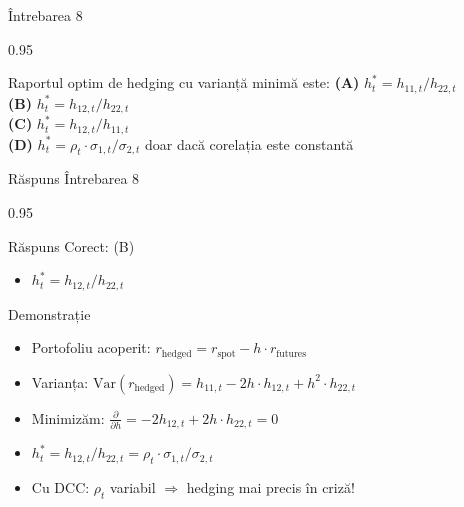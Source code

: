 \documentclass[9pt, aspectratio=169, t]{beamer}
\begin{document}
\begin{frame}{Întrebarea 8}
    \begin{cminipage}{0.95\textwidth}
    \begin{block}{Raportul optim de hedging cu varianță minimă este:}
        \textcolor{MainBlue}{\textbf{(A)}} $h_t^* = h_{11,t} / h_{22,t}$\\[3pt]
        \textcolor{MainBlue}{\textbf{(B)}} $h_t^* = h_{12,t} / h_{22,t}$\\[3pt]
        \textcolor{MainBlue}{\textbf{(C)}} $h_t^* = h_{12,t} / h_{11,t}$\\[3pt]
        \textcolor{MainBlue}{\textbf{(D)}} $h_t^* = \rho_t \cdot \sigma_{1,t} / \sigma_{2,t}$ doar dacă corelația este constantă
    \end{block}
    \end{cminipage}
\end{frame}

\begin{frame}{Răspuns Întrebarea 8}
    \begin{cminipage}{0.95\textwidth}
    \begin{exampleblock}{Răspuns Corect: (B)}
        \begin{itemize}\setlength{\itemsep}{0pt}
            \item $h_t^* = h_{12,t} / h_{22,t}$
        \end{itemize}
    \end{exampleblock}

    \pause
    \begin{block}{Demonstrație}
        \begin{itemize}\setlength{\itemsep}{0pt}
            \item Portofoliu acoperit: $r_{\text{hedged}} = r_{\text{spot}} - h \cdot r_{\text{futures}}$
            \item Varianța: $\text{Var}(r_{\text{hedged}}) = h_{11,t} - 2h \cdot h_{12,t} + h^2 \cdot h_{22,t}$
            \item Minimizăm: $\frac{\partial}{\partial h} = -2h_{12,t} + 2h \cdot h_{22,t} = 0$
            \item $h_t^* = h_{12,t} / h_{22,t} = \rho_t \cdot \sigma_{1,t}/\sigma_{2,t}$
            \item Cu DCC: $\rho_t$ variabil $\Rightarrow$ hedging mai precis în criză!
        \end{itemize}
    \end{block}
    \end{cminipage}
\end{frame}
\end{document}
